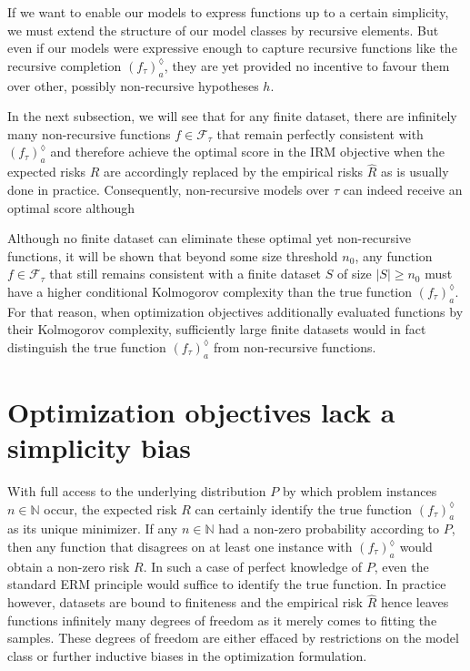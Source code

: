 If we want to enable our models to express functions up to a certain simplicity, we must extend the structure of our model classes by recursive elements.
But even if our models were expressive enough to capture recursive functions like the recursive completion $\left(f_{\tau}\right)_a^{\lozenge}$, they are yet provided no incentive to favour them over other, possibly non-recursive hypotheses $h$.

In the next subsection, we will see that for any finite dataset, there are infinitely many non-recursive functions $f\in\mathcal{F}_{\tau}$ that remain perfectly consistent with $\left(f_{\tau}\right)_a^{\lozenge}$ and therefore achieve the optimal score in the IRM objective when the expected risks $R$ are accordingly replaced by the empirical risks $\hat{R}$ as is usually done in practice.
Consequently, non-recursive models over $\tau$ can indeed receive an optimal score although

Although no finite dataset can eliminate these optimal yet non-recursive functions, it will be shown that beyond some size threshold $n_0$, any function $f\in\mathcal{F}_{\tau}$ that still remains consistent with a finite dataset $S$ of size $|S|\geq n_0$ must have a higher conditional Kolmogorov complexity than the true function $\left(f_{\tau}\right)_a^{\lozenge}$.
For that reason, when optimization objectives additionally evaluated functions by their Kolmogorov complexity, sufficiently large finite datasets would in fact distinguish the true function $\left(f_{\tau}\right)_a^{\lozenge}$ from non-recursive functions.

\section{Optimization objectives lack a simplicity bias}
\label{sec:optimization-objectives-lack-simplicity-bias}
With full access to the underlying distribution $P$ by which problem instances $n\in\mathbb{N}$ occur, the expected risk $R$ can certainly identify the true function $\left(f_{\tau}\right)_a^{\lozenge}$ as its unique minimizer.
If any $n\in\mathbb{N}$ had a non-zero probability according to $P$, then any function that disagrees on at least one instance with $\left(f_{\tau}\right)_a^{\lozenge}$ would obtain a non-zero risk $R$. 
In such a case of perfect knowledge of $P$, even the standard ERM principle would suffice to identify the true function.
In practice however, datasets are bound to finiteness and the empirical risk $\hat{R}$ hence leaves functions infinitely many degrees of freedom as it merely comes to fitting the samples.
These degrees of freedom are either effaced by restrictions on the model class or further inductive biases in the optimization formulation.

